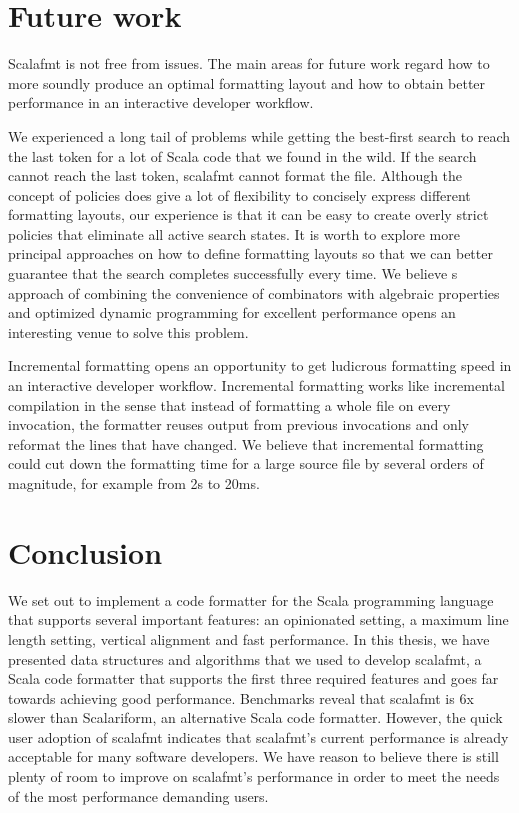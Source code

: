 
\section{Future work}
Scalafmt is not free from issues.
The main areas for future work regard how to more soundly produce an optimal formatting layout and how to obtain better performance in an interactive developer workflow.

We experienced a long tail of problems while getting the best-first search to reach the last token for a lot of Scala code that we found in the wild.
If the search cannot reach the last token, scalafmt cannot format the file.
Although the concept of policies does give a lot of flexibility to concisely express different formatting layouts, our experience is that it can be easy to create overly strict policies that eliminate all active search states.
It is worth to explore more principal approaches on how to define formatting layouts so that we can better guarantee that the search completes successfully every time.
We believe \rfmt{}s approach of combining the convenience of combinators with algebraic properties and optimized dynamic programming for excellent performance opens an interesting venue to solve this problem.

Incremental formatting opens an opportunity to get ludicrous formatting speed in an interactive developer workflow.
Incremental formatting works like incremental compilation in the sense that instead of formatting a whole file on every invocation, the formatter reuses output from previous invocations and only reformat the lines that have changed.
We believe that incremental formatting could cut down the formatting time for a large source file by several orders of magnitude, for example from 2s to 20ms.

\section{Conclusion}
We set out to implement a code formatter for the Scala programming language that supports several important features: an opinionated setting, a maximum line length setting, vertical alignment and fast performance.
In this thesis, we have presented data structures and algorithms that we used to develop scalafmt, a Scala code formatter that supports the first three required features and goes far towards achieving good performance.
Benchmarks reveal that scalafmt is 6x slower than Scalariform, an alternative Scala code formatter.
However, the quick user adoption of scalafmt indicates that scalafmt's current performance is already acceptable for many software developers.
We have reason to believe there is still plenty of room to improve on scalafmt's performance in order to meet the needs of the most performance demanding users.
